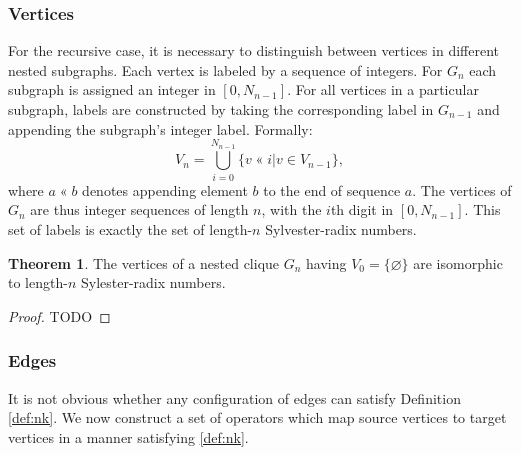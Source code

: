 \documentclass{article}
\theoremstyle{definition}
\newtheorem{theorem}{Theorem}
\DeclareMathOperator{\append}{\text{«}}
\begin{document}
\subsubsection{Vertices}

For the recursive case, it is necessary to distinguish between vertices in different nested subgraphs. Each vertex is labeled by a sequence of integers. For $G_n$ each subgraph is assigned an integer in $[0, N_{n-1}]$. For all vertices in a particular subgraph, labels are constructed by taking the corresponding label in $G_{n-1}$ and appending the subgraph's integer label. Formally:
\begin{equation}
V_n =
\bigcup_{i = 0}^{N_{n-1}}
\{ v \append i | v \in V_{n-1} \},
\end{equation}
where $a \append b$ denotes appending element $b$ to the end of sequence $a$. The vertices of $G_n$ are thus integer sequences of length $n$, with the $i$th digit in $[0, N_{n-1}]$. This set of labels is exactly the set of length-$n$ Sylvester-radix numbers.

\begin{theorem}
The vertices of a nested clique $G_n$ having $V_0 = \{ \varnothing \}$ are isomorphic to length-$n$ Sylester-radix numbers.
\end{theorem}

\begin{proof}
TODO
\end{proof}

\subsubsection{Edges}
It is not obvious whether any configuration of edges can satisfy Definition \ref{def:nk}. We now construct a set of operators which map source vertices to target vertices in a manner satisfying \ref{def:nk}.



\end{document}
